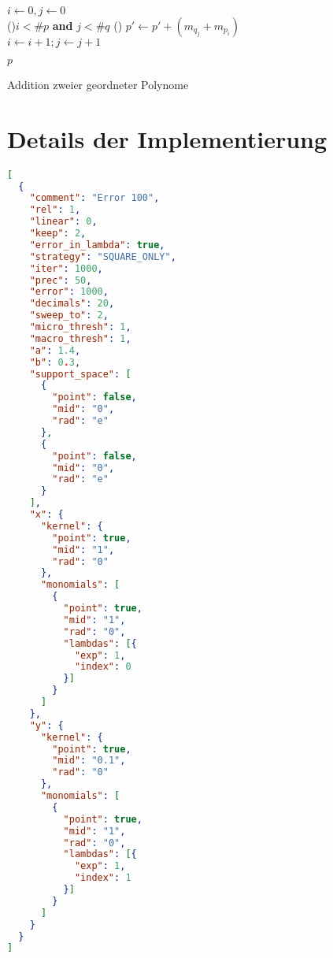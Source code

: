 \begin{algorithm}[H]
\SetAlgoLined
\label{algo:add}
$i \gets 0, j \gets 0$ \\
\While(){$i < \#p$ \textbf{and} $j  < \#q$} {
    \uElse(){
        $p' \gets p' + (m_{q_j} + m_{p_i})$\\
        $i \gets i+1; j \gets j +1 $\\
    }
}

\Return $p$

 \caption{Addition zweier geordneter Polynome}
\end{algorithm}



\section*{Details der Implementierung}

\begin{lstlisting}[language=JSON, caption=Bespielkonfiguration,captionpos=b, label=list:config]
 [
  {
    "comment": "Error 100",
    "rel": 1,
    "linear": 0,
    "keep": 2,
    "error_in_lambda": true,
    "strategy": "SQUARE_ONLY",
    "iter": 1000,
    "prec": 50,
    "error": 1000,
    "decimals": 20,
    "sweep_to": 2,
    "micro_thresh": 1,
    "macro_thresh": 1,
    "a": 1.4,
    "b": 0.3,
    "support_space": [
      {
        "point": false,
        "mid": "0",
        "rad": "e"
      },
      {
        "point": false,
        "mid": "0",
        "rad": "e"
      }
    ],
    "x": {
      "kernel": {
        "point": true,
        "mid": "1",
        "rad": "0"
      },
      "monomials": [
        {
          "point": true,
          "mid": "1",
          "rad": "0",
          "lambdas": [{
            "exp": 1,
            "index": 0
          }]
        }
      ]
    },
    "y": {
      "kernel": {
        "point": true,
        "mid": "0.1",
        "rad": "0"
      },
      "monomials": [
        {
          "point": true,
          "mid": "1",
          "rad": "0",
          "lambdas": [{
            "exp": 1,
            "index": 1
          }]
        }
      ]
    }
  }
]
\end{lstlisting}
